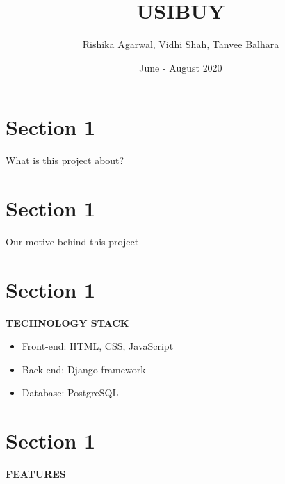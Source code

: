 \documentclass[10pt]{beamer} %
\title[USIBUY]{\textbf{USIBUY}}
\institute{Web App for Buying and Selling Used Books}
\author[Team 14]{Rishika Agarwal, Vidhi Shah, Tanvee Balhara}
\date{June - August 2020}
\begin{document}
{\titlepageBlue
\begin{frame}
  \titlepage
\end{frame}
}



\section{Section 1}
{\sectionheaderWhite %
\begin{frame}{What is this project about?}
\end{frame}
}

\section{Section 1}
{\sectionheaderWhite %
\begin{frame}{Our motive behind this project}{}
\end{frame}
}

\section{Section 1}
{\sectionheaderSkin %
\begin{frame}{\textbf{TECHNOLOGY STACK}}{
    
    \begin{itemize}
         \item Front-end: HTML, CSS, JavaScript  
         \item Back-end: Django framework
         \item Database: PostgreSQL  
    \end{itemize}
}
\end{frame}
}


\section{Section 1}
{\sectionheaderWhite %
\begin{frame}{\textbf{FEATURES}}{}
\end{frame}
}
\end{document}

